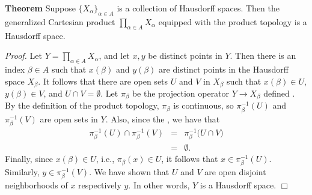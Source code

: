 \documentclass[12pt]{article}
\begin{document}
{\bf Theorem} Suppose $\{X_\alpha\}_{\alpha\in A}$ is a collection of
Hausdorff spaces. Then the
 generalized Cartesian product
 $ \prod_{\alpha\in A} X_\alpha $
equipped with the product topology is a Hausdorff space.

\emph{Proof.} Let $Y=\prod_{\alpha\in A} X_\alpha$, and
let $x,y$ be distinct points in $Y$. Then there is an index $\beta \in A$
such that $x(\beta)$ and $y(\beta)$ are distinct points in
the Hausdorff space $X_\beta$. It follows that there are open sets
$U$ and $V$ in $X_\beta$ such that $x(\beta)\in U$, $y(\beta) \in V$,
and $U\cap V = \emptyset$.
Let $\pi_\beta$ be the projection operator $Y\to X_\beta$ defined
. By the definition of
the product topology, $\pi_\beta$ is continuous, so
$\pi_\beta^{-1}(U)$ and $\pi_\beta^{-1}(V)$ are open sets in $Y$. Also,
since the 
, 
we have that
\begin{eqnarray*}
\pi_\beta^{-1}(U) \cap \pi_\beta^{-1}(V) &=& \pi_\beta^{-1} \big(U \cap V\big) \\
 &=& \emptyset.
\end{eqnarray*}
Finally, since $x(\beta)\in U$, i.e., $\pi_\beta(x)\in U$,
it follows
that $x\in \pi_\beta^{-1}(U)$. Similarly,  $y\in \pi_\beta^{-1}(V)$.
We have shown that $U$ and $V$ are open disjoint neighborhoods of
$x$ respectively $y$. In other words, $Y$ is a Hausdorff space.
$\Box$
\end{document}
